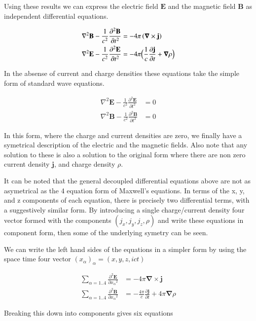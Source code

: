 \documentclass{article}      %
\newcommand{\grad}[0]{\boldsymbol{\nabla}}
\newcommand{\curl}[0]{\grad \times}
\newcommand{\delsquared}[0]{\nabla^2}
\newcommand{\D}[2] {\frac {\partial #2} {\partial #1}}
\newcommand{\Dsq}[2] {\frac {\partial^2 #2} {\partial {#1}^2}}
\newcommand{\Bj}[0]{\mathbf{j}}
\newcommand{\BB}[0]{\mathbf{B}}
\newcommand{\BE}[0]{\mathbf{E}}
\begin{document}
Using these results we can express the 
electric field $\BE$ and the
magnetic field $\BB$
as independent differential equations.

\begin{align*}
\delsquared \BB - \frac{1}{c^2} \Dsq{t}{\BB} &= - 4\pi \left(\curl \Bj\right) \\
\delsquared \BE - \frac{1}{c^2} \Dsq{t}{\BE} &= - 4\pi \Bigl(\frac{1}{c} \D{t}{\Bj} + \grad{\rho}\Bigr)
\end{align*}

In the absense of current and charge densities these equations take the simple form of standard wave
equations.

\begin{align*}
\delsquared \BE - \frac{1}{c^2} \Dsq{t}{\BE} &= 0 \\
\delsquared \BB - \frac{1}{c^2} \Dsq{t}{\BB} &= 0
\end{align*}

In this form, where the charge and current densities are zero, we finally have 
a symetrical description of the electric and the magnetic fields.  Also note 
that any solution to these is also a solution to the original form where 
there are non zero current density $\Bj$, and charge density $\rho$.

It can 
be noted that the general decoupled differential equations above are not 
as asymetrical as the 4 equation form of Maxwell's equations.  In terms of the x, y, and z components 
of each equation, there is precisely two differential terms, with a suggestively 
similar form.
By introducing a 
single charge/current density four vector formed with the components 
$(j_x, j_y, j_z, \rho)$ and write these equations in component 
form, 
then some of the underlying symetry can be seen.

We 
can write the left hand sides of the equations in a simpler form by using the 
space time four vector $(x_\alpha)_\alpha = (x, y, z, ict)$

\begin{align*}
\sum_{\alpha = 1 .. 4}{\Dsq{x_\alpha}{\BE}} &= - 4\pi \curl \Bj \\
\sum_{\alpha = 1 .. 4}{\Dsq{x_\alpha}{\BB}} &= - \frac{4\pi}{c} \D{t}{\Bj} + 4\pi \grad{\rho}
\end{align*}

Breaking this down into components gives six equations

\end{document}
